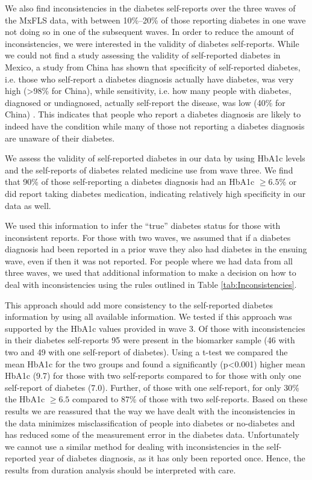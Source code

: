 We also find inconsistencies in the diabetes self-reports over the three waves of the \ac{MxFLS} data, with between 10\%--20\% of those reporting diabetes in one wave not doing so in one of the subsequent waves. In order to reduce the amount of inconsistencies, we were interested in the validity of diabetes self-reports. While we could not find a study assessing the validity of self-reported diabetes in Mexico, a study from China has shown that specificity of self-reported diabetes, i.e. those who self-report a diabetes diagnosis actually have diabetes, was very high (>98\% for China), while sensitivity, i.e. how many people with diabetes, diagnosed or undiagnosed, actually self-report the disease, was low (40\% for China) \parencite{Yuan2015}. This indicates that people who report a diabetes diagnosis are likely to indeed have the condition while many of those not reporting a diabetes diagnosis are unaware of their diabetes.

We assess the validity of self-reported diabetes in our data by using \ac{HbA1c} levels and the self-reports of diabetes related medicine use from wave three. We find that 90\% of those self-reporting a diabetes diagnosis had an \ac{HbA1c} $\geq6.5$\% or did report taking diabetes medication, indicating relatively high specificity in our data as well.

We used this information to infer the ``true'' diabetes status for those with inconsistent reports. For those with two waves, we assumed that if a diabetes diagnosis had been reported in a prior wave they also had diabetes in the ensuing wave, even if then it was not reported.
For people where we had data from all three waves, we used that additional information to make a decision on how to deal with inconsistencies using the rules outlined in Table \ref{tab:Inconsistencies}.


This approach should add more consistency to the self-reported diabetes information by using all available information. We tested if this approach was supported by the \ac{HbA1c} values provided in wave 3. Of those with inconsistencies in their diabetes self-reports 95 were present in the biomarker sample (46 with two and 49 with one self-report of diabetes). Using a t-test we compared the mean \ac{HbA1c} for the two groups and found a significantly (p<0.001) higher mean \ac{HbA1c} (9.7) for those with two self-reports compared to for those with only one self-report of diabetes (7.0). Further, of those with one self-report, for only 30\% the \ac{HbA1c} $\geq 6.5$ compared to 87\% of those with two self-reports. Based on these results we are reassured that the way we have dealt with the inconsistencies in the data minimizes misclassification of people into diabetes or no-diabetes and has reduced some of the measurement error in the diabetes data. Unfortunately we cannot use a similar method for dealing with inconsistencies in the self-reported year of diabetes diagnosis, as it has only been reported once. Hence, the results from duration analysis should be interpreted with care.


